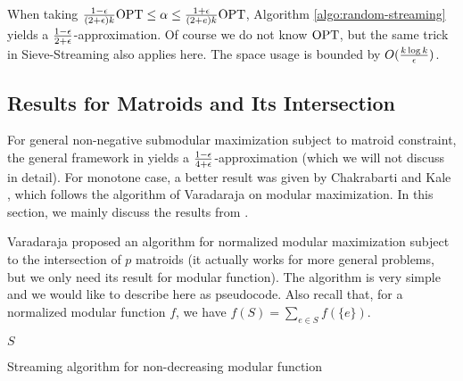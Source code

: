When taking $\frac{1 - \epsilon}{(2 + \epsilon)k}\text{OPT}\leq \alpha \leq \frac{1 + \epsilon}{(2 + e)k}\text{OPT}$, Algorithm \ref{algo:random-streaming} yields a $\frac{1 - \epsilon}{2 + \epsilon}$-approximation. Of course we do not know $\text{OPT}$, but the same trick in {\sc Sieve-Streaming} also applies here. The space usage is bounded by $O(\frac{k\log k}{\epsilon})$.



\subsection{Results for Matroids and Its Intersection}
For general non-negative submodular maximization subject to matroid constraint, the general framework in \cite{CGQ15} yields a $\frac{1 - \epsilon}{4 + \epsilon}$-approximation (which we will not discuss in detail). For monotone case, a better result was given by Chakrabarti and Kale \cite{CK14}, which follows the algorithm of Varadaraja \cite{V11} on modular maximization. In this section, we mainly discuss the results from \cite{V11,CK14}.

Varadaraja \cite{V11} proposed an algorithm for normalized modular maximization subject to the intersection of $p$ matroids (it actually works for more general problems, but we only need its result for modular function). The algorithm is very simple and we would like to describe here as pseudocode. Also recall that, for a normalized modular function $f$, we have $f(S) = \sum_{e\in S}f(\{e\})$. 



\begin{algorithm}[H]
\DontPrintSemicolon %

 {
}
\Return $S$\;
\caption{Streaming algorithm for non-decreasing modular function}
\label{algo:streaming-modular}
\end{algorithm}

